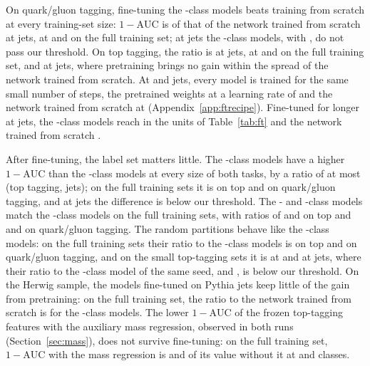 \documentclass[11pt]{article}
\newcommand{\Kfull}{\VocabSizeLoneeighteight}
\newcommand{\Kres}{\VocabSizeLonesixtwo}
\newcommand{\Kmid}{\VocabSizeRfourtwoQone}
\newcommand{\Kcoarse}{\VocabSizeRonesixQone}
\newcommand{\oma}{\ensuremath{1-\mathrm{AUC}}}
\begin{document}
On quark/gluon tagging, fine-tuning the \Kfull-class models beats training from scratch at every
training-set size: $\oma$ is \MlstFtCmpQgFullOverScratchEThree{} of that of the network trained
from scratch at \FtSizeEThree{} jets, \MlstFtCmpQgFullOverScratchEFour{} at \FtSizeEFour{} and
\MlstFtCmpQgFullOverScratchMax{} on the full training set; at \FtSizeEFour{} jets the
\Kcoarse-class models, with \MlstFtCmpQgCoarseOverScratchEFour, do not pass our threshold. On top
tagging, the ratio is \MlstFtCmpTopFullOverScratchEThree{} at \FtSizeEThree{} jets,
\MlstFtCmpTopFullOverScratchEFive{} at \FtSizeEFive{} and \MlstFtCmpTopFullOverScratchMax{} on
the full training set, and \MlstFtCmpTopFullOverScratchEFour{} at \FtSizeEFour{} jets, where
pretraining brings no gain within the spread of the network trained from scratch. At \FtSizeEThree{} and
\FtSizeEFour{} jets, every model is trained for the same small number of steps, the pretrained
weights at a learning rate of \MlstFtLr{} and the network trained from scratch at
\MlstFtRefLr{} (Appendix~\ref{app:ftrecipe}). Fine-tuned for longer at \FtSizeEFour{} jets, the \Kfull-class
models reach \MlstTopCheckFullLong{} in the units of Table~\ref{tab:ft} and the network trained
from scratch \MlstTopCheckScratchLong.

After fine-tuning, the label set matters little. The \Kcoarse-class models have a higher $\oma$
than the \Kfull-class models at every size of both tasks, by a ratio of at most
\MlstFtCmpTopCoarseOverFullEFour{} (top tagging, \FtSizeEFour{} jets); on the full training sets it
is \MlstFtCmpTopCoarseOverFullMax{} on top and \MlstFtCmpQgCoarseOverFullMax{} on quark/gluon
tagging, and at \FtSizeEThree{} jets the difference is below our threshold. The \Kres- and
\Kmid-class models match the \Kfull-class models on the full training sets, with ratios of
\MlstFtCmpTopResOverFullMax{} and \MlstFtCmpTopMidOverFullMax{} on top and
\MlstFtCmpQgResOverFullMax{} and \MlstFtCmpQgMidOverFullMax{} on quark/gluon tagging. The random
partitions behave like the \Kcoarse-class models: on the full training sets their ratio to the
\Kfull-class models is \MlstFtCmpTopRandOverFullMax{} on top and \MlstFtCmpQgRandOverFullMax{} on
quark/gluon tagging, and on the small top-tagging sets it is \MlstFtCmpTopRandOverFullEThree{} at
\FtSizeEThree{} and \MlstFtCmpTopRandOverFullEFour{} at \FtSizeEFour{} jets, where their ratio to
the \Kcoarse-class model of the same seed, \MlstFtCmpTopRandOverCoarseEThree{} and
\MlstFtCmpTopRandOverCoarseEFour, is below our threshold.
On the Herwig sample, the models fine-tuned on Pythia jets keep little of
the gain from pretraining: on the full training set, the ratio to the network trained from
scratch is \MlstFtCmpQgHerwigFullOverScratchMax{} for the \Kfull-class models. The lower $\oma$ of
the frozen top-tagging features with the auxiliary mass regression, observed in both runs
(Section~\ref{sec:mass}), does not survive fine-tuning: on the full training set, $\oma$ with the mass regression is
\MlstFtCmpTopResMassOverResMax{} and \MlstFtCmpTopCoarseMassOverCoarseMax{} of its value without
it at \Kres{} and \Kcoarse{} classes.
\end{document}
